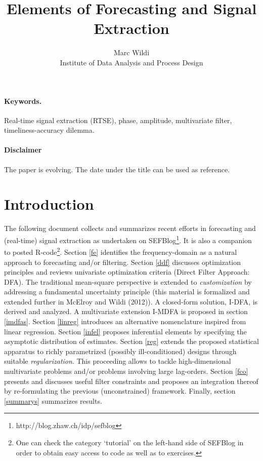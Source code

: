 \documentclass[11pt]{article}
\begin{document}
\title{Elements of Forecasting and Signal Extraction}
\author{Marc Wildi \\
Institute of Data Analysis and Process
Design}
\maketitle

\begin{abstract}
\noindent 
\end{abstract}
%
\paragraph{Keywords.}
Real-time signal extraction (RTSE), phase, amplitude, multivariate filter, timeliness-accuracy dilemma.
%
\paragraph{Disclaimer}
The paper is evolving. The date under the title can be used as reference.
%
\section{Introduction}

The following document collects and summarizes recent efforts in forecasting and (real-time) signal extraction as undertaken on SEFBlog\footnote{http://blog.zhaw.ch/idp/sefblog}. It is also a companion to posted R-code\footnote{One can check the category `tutorial' on the left-hand side of SEFBlog in order to obtain easy access to code as well as to  exercises.}. Section \ref{fe} identifies  the frequency-domain as a natural approach to forecasting and/or filtering. Section \ref{ddf} discusses optimization principles and reviews univariate optimization criteria (Direct Filter Approach: DFA). The traditional mean-square perspective is extended to \emph{customization}  by addressing a fundamental uncertainty principle (this material is formalized and extended further in McElroy and Wildi (2012)). A closed-form solution, I-DFA, is derived and analyzed.  A multivariate extension I-MDFA is proposed in section \ref{imdfas}. 
Section \ref{linreg} introduces an alternative nomenclature inspired from linear regression. Section \ref{infel} proposes inferential elements by specifying the asymptotic distribution of estimates. Section \ref{reg} extends the proposed statistical apparatus to richly parametrized (possibly ill-conditioned) designs through suitable \emph{regularization}. This proceeding allows to tackle high-dimensional multivariate problems and/or problems involving large lag-orders. Section \ref{fco} presents and discusses useful filter constraints and proposes an  integration thereof by re-formulating the previous (unconstrained) framework. Finally, section \ref{summarys} summarizes  results.  
\end{document}
